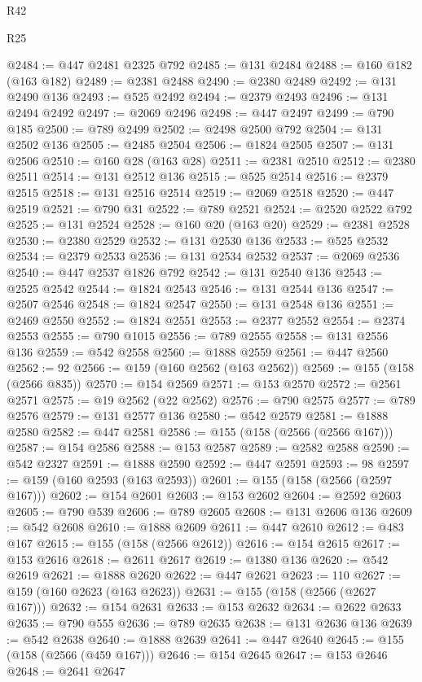 \begin{lexlean}{R42}
\begin{lexlean}{R25}
\begin{coremodule}
{{{{{{{{{{{{{{{{{{{{{{{{{{{{{{{{{{{{{{{{{{{{{{{{{{{{{{{{{{{{{{{{{{{{{{{{{{{{{{{{{{{{{{{{{{{{{{{{{{{{{{{{{{{{{{{{{{{{{{{{{{{{{{{{{{{{{{{{{{{{{{{{{{{{{{{{{{{{{{{{{{{{{{{{{{{{{{{{{{{{{{{{{{{{{{{{{{{{{{{@2484 := @447 @2481 @2325 @792
@2485 := @131 @2484
@2488 := @160 @182 (@163 @182)
@2489 := @2381 @2488
@2490 := @2380 @2489
@2492 := @131 @2490 @136
@2493 := @525 @2492
@2494 := @2379 @2493
@2496 := @131 @2494 @2492
@2497 := @2069 @2496
@2498 := @447 @2497
@2499 := @790 @185
@2500 := @789 @2499
@2502 := @2498 @2500 @792
@2504 := @131 @2502 @136
@2505 := @2485 @2504
@2506 := @1824 @2505
@2507 := @131 @2506
@2510 := @160 @28 (@163 @28)
@2511 := @2381 @2510
@2512 := @2380 @2511
@2514 := @131 @2512 @136
@2515 := @525 @2514
@2516 := @2379 @2515
@2518 := @131 @2516 @2514
@2519 := @2069 @2518
@2520 := @447 @2519
@2521 := @790 @31
@2522 := @789 @2521
@2524 := @2520 @2522 @792
@2525 := @131 @2524
@2528 := @160 @20 (@163 @20)
@2529 := @2381 @2528
@2530 := @2380 @2529
@2532 := @131 @2530 @136
@2533 := @525 @2532
@2534 := @2379 @2533
@2536 := @131 @2534 @2532
@2537 := @2069 @2536
@2540 := @447 @2537 @1826 @792
@2542 := @131 @2540 @136
@2543 := @2525 @2542
@2544 := @1824 @2543
@2546 := @131 @2544 @136
@2547 := @2507 @2546
@2548 := @1824 @2547
@2550 := @131 @2548 @136
@2551 := @2469 @2550
@2552 := @1824 @2551
@2553 := @2377 @2552
@2554 := @2374 @2553
@2555 := @790 @1015
@2556 := @789 @2555
@2558 := @131 @2556 @136
@2559 := @542 @2558
@2560 := @1888 @2559
@2561 := @447 @2560
@2562 := 92
@2566 := @159 (@160 @2562 (@163 @2562))
@2569 := @155 (@158 (@2566 @835))
@2570 := @154 @2569
@2571 := @153 @2570
@2572 := @2561 @2571
@2575 := @19 @2562 (@22 @2562)
@2576 := @790 @2575
@2577 := @789 @2576
@2579 := @131 @2577 @136
@2580 := @542 @2579
@2581 := @1888 @2580
@2582 := @447 @2581
@2586 := @155 (@158 (@2566 (@2566 @167)))
@2587 := @154 @2586
@2588 := @153 @2587
@2589 := @2582 @2588
@2590 := @542 @2327
@2591 := @1888 @2590
@2592 := @447 @2591
@2593 := 98
@2597 := @159 (@160 @2593 (@163 @2593))
@2601 := @155 (@158 (@2566 (@2597 @167)))
@2602 := @154 @2601
@2603 := @153 @2602
@2604 := @2592 @2603
@2605 := @790 @539
@2606 := @789 @2605
@2608 := @131 @2606 @136
@2609 := @542 @2608
@2610 := @1888 @2609
@2611 := @447 @2610
@2612 := @483 @167
@2615 := @155 (@158 (@2566 @2612))
@2616 := @154 @2615
@2617 := @153 @2616
@2618 := @2611 @2617
@2619 := @1380 @136
@2620 := @542 @2619
@2621 := @1888 @2620
@2622 := @447 @2621
@2623 := 110
@2627 := @159 (@160 @2623 (@163 @2623))
@2631 := @155 (@158 (@2566 (@2627 @167)))
@2632 := @154 @2631
@2633 := @153 @2632
@2634 := @2622 @2633
@2635 := @790 @555
@2636 := @789 @2635
@2638 := @131 @2636 @136
@2639 := @542 @2638
@2640 := @1888 @2639
@2641 := @447 @2640
@2645 := @155 (@158 (@2566 (@459 @167)))
@2646 := @154 @2645
@2647 := @153 @2646
@2648 := @2641 @2647
}}}}}}}}}}}}}}}}}}}}}}}}}}}}}}}}}}}}}}}}}}}}}}}}}}}}}}}}}}}}}}}}}}}}}}}}}}}}}}}}}}}}}}}}}}}}}}}}}}}}}}}}}}}}}}}}}}}}}}}}}}}}}}}}}}}}}}}}}}}}}}}}}}}}}}}}}}}}}}}}}}}}}}}}}}}}}}}}}}}}}}}}}}}}}}}}}}}}}}}
\end{coremodule}
\end{lexlean}
\end{lexlean}
